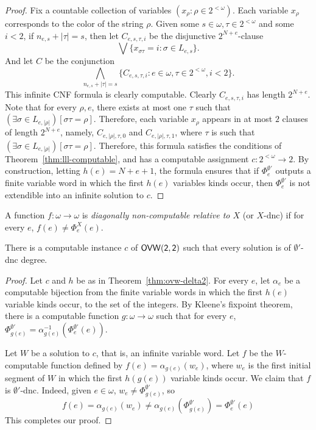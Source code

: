 \begin{proof}
Fix a countable collection of variables $(x_\rho : \rho \in 2^{<\omega})$. Each variable $x_\rho$ corresponds to the color of the string $\rho$.
Given some $s\in\omega,\tau \in 2^{<\omega}$ and some $i < 2$,
if $n_{e,s}+|\tau| = s $, then
let $C_{e,s,\tau,i}$ be the disjunctive $2^{N+e}$-clause
$$
\bigvee \{x_{\sigma\tau} = i : \sigma \in L_{e,s} \}.
$$
And let $C$ be the conjunction
$$
\bigwedge\limits_{n_{e,s}+|\tau| = s }
 \{ C_{e,s,\tau, i} : e \in \omega, \tau \in 2^{<\omega}, i < 2\}.
$$
This infinite CNF formula is clearly computable. Clearly $C_{e,s,\tau,i}$ has length $2^{N+e}$. Note that for every $\rho,e$, there exists at most one $\tau$ such that $(\exists \sigma\in L_{e,|\rho|})[\sigma\tau = \rho]$. Therefore, each variable $x_\rho$ appears in at most $2$ clauses of length $2^{N+e}$, namely, $C_{e, |\rho|,\tau, 0}$ and $C_{e, |\rho|, \tau, 1}$, where $\tau$ is such that $(\exists \sigma\in L_{e,|\rho|})[\sigma\tau = \rho]$. Therefore, this formula satisfies the conditions of Theorem~\ref{thm:lll-computable}, and has a computable assignment $c : 2^{<\omega} \to 2$. By construction, letting $h(e) = N+e+1$, the formula ensures that if $\Phi_e^{\emptyset'}$ outputs a finite variable word in which the first $h(e)$ variables kinds occur, then $\Phi_e^{\emptyset'}$ is not extendible into an infinite solution to $c$.
\end{proof}

\begin{definition}
	A function $f : \omega \to \omega$ is \emph{diagonally non-computable relative to $X$} (or $X$-dnc) if for every $e$,
	$f(e) \neq \Phi_e^X(e)$.
\end{definition}

\begin{corollary}
	There is a computable instance $c$ of $\sf{OVW}(2,2)$ such that every solution is of $\emptyset'$-dnc degree.
\end{corollary}
\begin{proof}
	Let $c$ and $h$ be as in Theorem~\ref{thm:ovw-delta2}. For every $e$, let $\alpha_e$ be a computable bijection from the finite variable words in which the first $h(e)$ variable kinds occur, to the set of the integers.
	By Kleene's fixpoint theorem, there is a computable function $g : \omega \to \omega$ such that for every $e$, $\Phi^{\emptyset'}_{g(e)} = \alpha^{-1}_{g(e)}(\Phi^{\emptyset'}_e(e))$.	
	
	Let $W$ be a solution to $c$, that is, an infinite variable word. Let $f$ be the $W$-computable function defined by $f(e) = \alpha_{g(e)}(w_e)$, where $w_e$ is the first initial segment of $W$ in which the first $h(g(e))$ variable kinds occur. We claim that $f$ is $\emptyset'$-dnc. Indeed, given $e \in \omega$, $w_e \neq \Phi^{\emptyset'}_{g(e)}$, so
	$$
	f(e) = \alpha_{g(e)}(w_e) \neq \alpha_{g(e)}(\Phi^{\emptyset'}_{g(e)})  = \Phi^{\emptyset'}_e(e)
	$$
	This completes our proof.
\end{proof}

